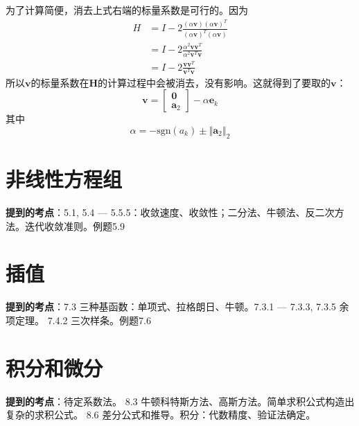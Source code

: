 \documentclass[14pt, letterpaper, UTF8, fontset=windowsnew, heading=true]{article}
\providecommand{\norm}[1]{\left\Vert#1\right\Vert}
\begin{document}
为了计算简便，消去上式右端的标量系数是可行的。因为
$$ \begin{aligned} H &=I-2 \frac{(\alpha \bm{v})( \alpha \bm{v})^T} {( \alpha \bm{v})^T 
(\alpha \bm{v})} \\ &=I-2\frac{\alpha ^2 \bm{v} \bm{v}^T}{\alpha ^2 \bm{v}^T 
\bm{v}} \\ &= I-2\frac{ \bm{v} \bm{v}^T}{ \bm{v}^T  \bm{v}} \end{aligned} $$
所以$\bm{v}$的标量系数在$\bm{H}$的计算过程中会被消去，没有影响。这就得到了要取的$\bm{v}$：
$$\bm{v}=\begin{bmatrix}\bm{0}\\ \bm{a}_2\end{bmatrix}-\alpha \bm{e}_k$$
其中
$$\alpha=-\text{sgn} (a_k)\pm\norm{\bm{a}_2}_2$$


\section{非线性方程组}

\textbf{提到的考点}：5.1, 5.4 --- 5.5.5：收敛速度、收敛性；二分法、牛顿法、反二次方法。迭代收敛准则。例题5.9

\section{插值}

\textbf{提到的考点}：7.3 三种基函数：单项式、拉格朗日、牛顿。7.3.1 --- 7.3.3, 7.3.5 余项定理。
7.4.2 三次样条。例题7.6

\section{积分和微分}

\textbf{提到的考点}：待定系数法。 8.3 牛顿科特斯方法、高斯方法。简单求积公式构造出复杂的求积公式。
8.6 差分公式和推导。积分：代数精度、验证法确定。
	
\end{document}

